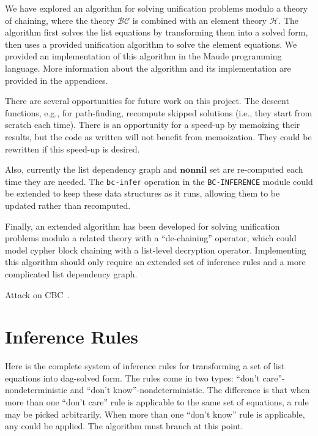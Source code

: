 \documentclass[11pt]{article}
\newcommand{\BC}{\mathcal{BC}}
\newcommand{\HH}{\mathcal{H}}
\newcommand{\Nonnil}{\mathbf{nonnil}}
\begin{document}
We have explored an algorithm for solving unification problems modulo a theory
of chaining, where the theory $\BC$ is combined with an element theory $\HH$.
The algorithm first solves the list equations by transforming them into a
solved form, then uses a provided unification algorithm to solve the element
equations. We provided an implementation of this algorithm in the Maude
programming language. More information about the algorithm and its
implementation are provided in the appendices.

There are several opportunities for future work on this project. The descent
functions, e.g., for path-finding, recompute skipped solutions (i.e., they
start from scratch each time). There is an opportunity for a speed-up by
memoizing their results, but the code as written will not benefit from
memoization. They could be rewritten if this speed-up is desired.

Also, currently the list dependency graph and $\Nonnil$ set are re-computed
each time they are needed. The \lstinline|bc-infer| operation in the
\lstinline|BC-INFERENCE| module could be extended to keep these data structures
as it runs, allowing them to be updated rather than recomputed.

Finally, an extended algorithm has been developed for solving unification
problems modulo a related theory with a ``de-chaining'' operator, which could
model cypher block chaining with a list-level decryption operator. Implementing
this algorithm should only require an extended set of inference rules and a
more complicated list dependency graph.

Attack on CBC~\cite{ekr2011security}.



\clearpage
\appendix

\section{Inference Rules}\label{appendix:inference}

Here is the complete system of inference rules for transforming a set of list
equations into dag-solved form. The rules come in two types: ``don't
care''-nondeterministic and ``don't know''-nondeterministic. The difference
is that when more than one ``don't care'' rule is applicable to the same
set of equations, a rule may be picked arbitrarily. When more than one ``don't
know'' rule is applicable, any could be applied. The algorithm must branch at
this point.
\end{document}
